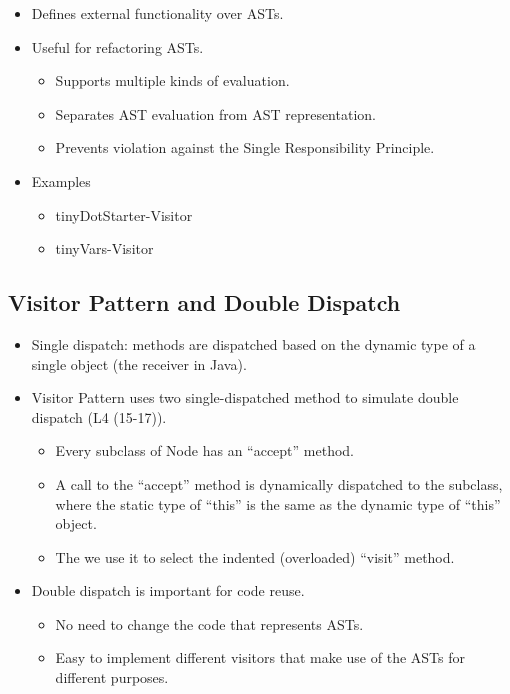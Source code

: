 \documentclass{article}
\begin{document}
\begin{itemize}
\begin{itemize}
\begin{minipage}{\linewidth}
        \end{minipage}
        \item Defines external functionality over ASTs.
        \item Useful for refactoring ASTs.
        \begin{itemize}
            \item Supports multiple kinds of evaluation.
            \item Separates AST evaluation from AST representation.
            \item Prevents violation against the Single Responsibility Principle.
        \end{itemize}
        \item Examples
        \begin{itemize}
            \item tinyDotStarter-Visitor
            \item tinyVars-Visitor
        \end{itemize}
    \end{itemize}
\end{itemize}

\subsection{Visitor Pattern and Double Dispatch}

\begin{itemize}
    \item Single dispatch: methods are dispatched based on the dynamic type of a single object (the receiver in Java).
    \item Visitor Pattern uses two single-dispatched method to simulate double dispatch (L4 (15-17)).
    \begin{itemize}
        \item Every subclass of Node has an ``accept'' method.
        \item A call to the ``accept'' method is dynamically dispatched to the subclass, where the static type of ``this'' is the same as the dynamic type of ``this'' object.
        \item The we use it to select the indented (overloaded) ``visit'' method.
    \end{itemize}
    \item Double dispatch is important for code reuse.
    \begin{itemize}
        \item No need to change the code that represents ASTs.
        \item Easy to implement different visitors that make use of the ASTs for different purposes.
    \end{itemize}
\end{itemize}
\end{document}
